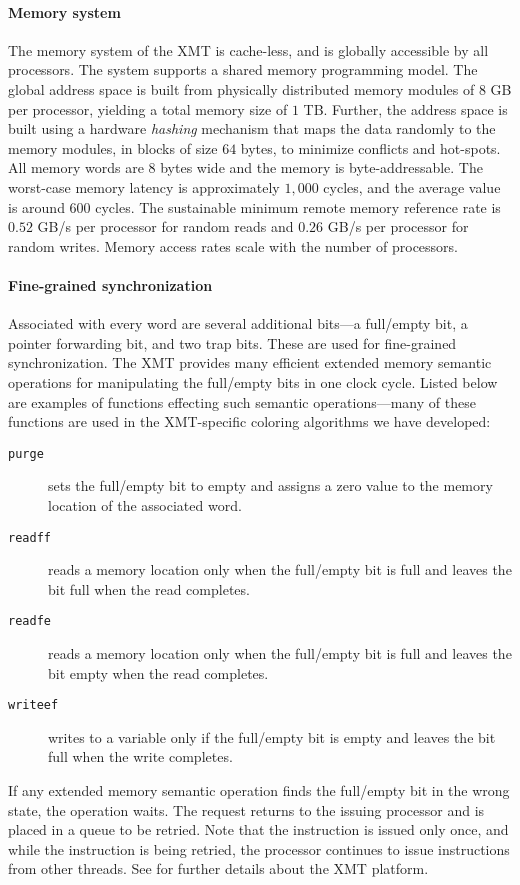 \documentclass{article}
\begin{document}
\paragraph{Memory system}
The memory system of the  XMT is cache-less, and is globally accessible by all processors.
The system supports a shared memory programming model.
The global address space is built from physically distributed memory modules of $8$ GB per processor, yielding a total memory size of $1$ TB.
Further, the address space is built using a hardware {\em hashing} mechanism 
that maps the data randomly to the memory modules,  
in blocks of size $64$ bytes,  to  minimize conflicts and hot-spots. 
All memory words are $8$ bytes wide and the memory is byte-addressable.
The worst-case memory latency is approximately $1,000$ cycles, and the average 
value is around $600$ cycles.  
The sustainable minimum remote memory reference rate is $0.52$ GB/s 
per processor for random reads and $0.26$ GB/s per processor for random writes.  
Memory access rates scale with the number of processors.

\paragraph{Fine-grained synchronization}
Associated with every word are several additional bits---a full/empty bit, a pointer forwarding bit,
and two trap bits. These are used for fine-grained  synchronization.
The XMT provides many efficient extended memory semantic operations for manipulating 
the full/empty bits in one clock cycle.
Listed below are examples of functions effecting such semantic operations---many of 
these functions are used in the XMT-specific coloring algorithms we have developed:
\begin{description}
\item[\texttt{purge}] sets the full/empty bit to empty and assigns a zero value 
to the memory location of the associated word. 
\item[\texttt{readff}] reads a memory location only when the full/empty bit is full and leaves the
bit full when the read completes.
\item[\texttt{readfe}] reads a memory location only when the full/empty bit is full and leaves
the bit empty when the read completes.
\item[\texttt{writeef}] writes to a variable only if the full/empty bit is empty and leaves
the bit full when the write completes.
\end{description}
If any extended memory semantic operation finds the full/empty bit in the wrong state, 
the operation waits.
The request returns to the issuing processor and is placed in a queue to be retried.
Note that the instruction is issued only once, and while the instruction is being retried, the processor continues to issue instructions from other threads.
See \cite{John1,Nieplocha07} for further details about the XMT platform.
\end{document}
